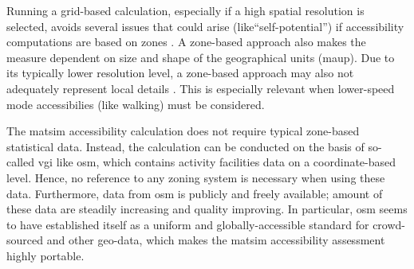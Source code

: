 Running a grid-based calculation, especially if a high spatial resolution is selected, avoids several issues
that could arise (like``self-potential'') if accessibility computations are based on zones
\citep[see, e.g.,][]{NicolaiNagelHiResAccessibilityMethod}. A zone-based approach also makes the 
measure dependent on size and shape of the geographical units (\cf \gls{maup}). 
Due to its typically lower resolution level, a zone-based approach may also not adequately represent local details
\citep{Kwan1998PointBasedAccessibility}. This is especially relevant
when lower-speed mode accessibilies (like walking) must be considered.

The \gls{matsim} accessibility calculation does not require typical zone-based statistical data. Instead, the
calculation can be conducted on the basis of so-called \gls{vgi} like \gls{osm}, which contains
activity facilities data on a coordinate-based level. Hence, no reference to any zoning
system is necessary when using these data. Furthermore, data from \gls{osm} is publicly and freely available; 
amount of these data are steadily increasing and quality improving. In particular, \gls{osm} seems to have 
established itself as a uniform and globally-accessible standard for crowd-sourced and other geo-data, 
which makes the \gls{matsim} accessibility assessment highly portable.


